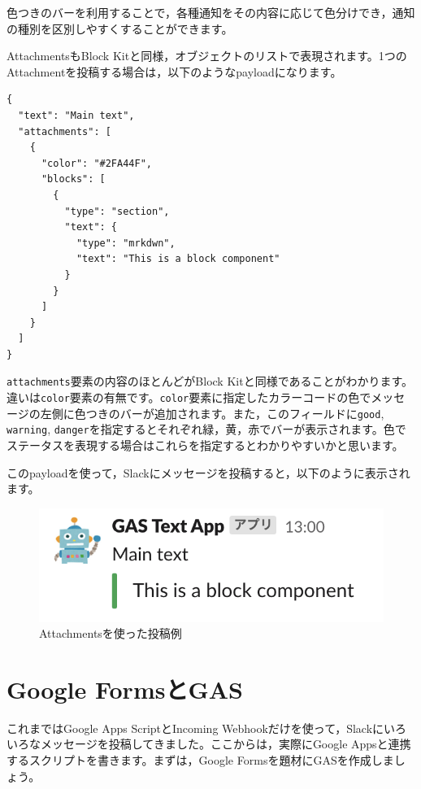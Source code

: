\documentclass[uplatex,a4j]{jsarticle}
\begin{document}
色つきのバーを利用することで，各種通知をその内容に応じて色分けでき，通知の種別を区別しやすくすることができます。

AttachmentsもBlock Kitと同様，オブジェクトのリストで表現されます。1つのAttachmentを投稿する場合は，以下のようなpayloadになります。

\begin{lstlisting}[basicstyle=\ttfamily\footnotesize,frame=single,caption=Attachments payload sample]
{
  "text": "Main text",
  "attachments": [
    {
      "color": "#2FA44F",
      "blocks": [
        {
          "type": "section",
          "text": {
            "type": "mrkdwn",
            "text": "This is a block component"
          }
        }
      ]
    }
  ]
}
\end{lstlisting}

\verb|attachments|要素の内容のほとんどがBlock Kitと同様であることがわかります。違いは\verb|color|要素の有無です。\verb|color|要素に指定したカラーコードの色でメッセージの左側に色つきのバーが追加されます。また，このフィールドに\verb|good|, \verb|warning|, \verb|danger|を指定するとそれぞれ緑，黄，赤でバーが表示されます。色でステータスを表現する場合はこれらを指定するとわかりやすいかと思います。

このpayloadを使って，Slackにメッセージを投稿すると，以下のように表示されます。

\begin{figure}[H]
 \centering
 \includegraphics[keepaspectratio, scale=0.8]{images/attachments_sample.png}
 \caption{Attachmentsを使った投稿例}
 \label{fig:attachments_sample}
\end{figure}

\section{Google FormsとGAS}

これまではGoogle Apps ScriptとIncoming Webhookだけを使って，Slackにいろいろなメッセージを投稿してきました。ここからは，実際にGoogle Appsと連携するスクリプトを書きます。まずは，Google Formsを題材にGASを作成しましょう。
\end{document}
